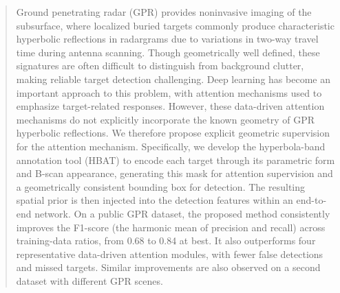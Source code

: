 \documentclass[lettersize,journal]{IEEEtran}
\begin{document}
\begin{abstract}
Ground penetrating radar (GPR) provides noninvasive imaging of the subsurface, where localized buried targets commonly produce characteristic hyperbolic reflections in radargrams due to variations in two-way travel time during antenna scanning.
Though geometrically well defined, these signatures are often difficult to distinguish from background clutter, making reliable target detection challenging.
Deep learning has become an important approach to this problem, with attention mechanisms used to emphasize target-related responses. However, these data-driven attention mechanisms do not explicitly incorporate the known geometry of GPR hyperbolic reflections.
We therefore propose explicit geometric supervision for the attention mechanism. 
Specifically, we develop the hyperbola-band annotation tool (HBAT) to encode each target through its parametric form and B-scan appearance, generating this mask for attention supervision and a geometrically consistent bounding box for detection.  
The resulting spatial prior is then injected into the detection features within an end-to-end network. 
On a public GPR dataset, the proposed method consistently improves the F1-score (the harmonic mean of precision and recall) across training-data ratios, from 0.68 to 0.84 at best.
It also outperforms four representative data-driven attention modules, with fewer false detections and missed targets.  
Similar improvements are also observed on a second dataset with different GPR scenes.



\end{abstract}
\end{document}
